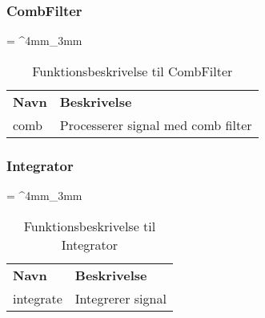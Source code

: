 \begin{appendices}
\subsubsection{CombFilter}
\begin{table}[H]
	\renewcommand{\arraystretch}{2}
	\centering
	\sffamily
	\tabulinesep = ^4mm_3mm
	\begin{tabu}{ m{4cm}  m{8.5cm} }
		\color{white}\bfseries Navn &\color{white}\bfseries Beskrivelse \\
		comb & Processerer signal med comb filter  \\
	\end{tabu}
	\caption{Funktionsbeskrivelse til CombFilter}
	\label{tab:func_descr_CombFilter}
\end{table}

\subsubsection{Integrator}
\begin{table}[H]
	\renewcommand{\arraystretch}{2}
	\centering
	\sffamily
	\tabulinesep = ^4mm_3mm
	\begin{tabu}{ m{4cm}  m{8.5cm} }
		\color{white}\bfseries Navn &\color{white}\bfseries Beskrivelse \\
		integrate & Integrerer signal  \\
	\end{tabu}
	\caption{Funktionsbeskrivelse til Integrator}
	\label{tab:func_descr_Integrator}
\end{table}


\end{appendices}
